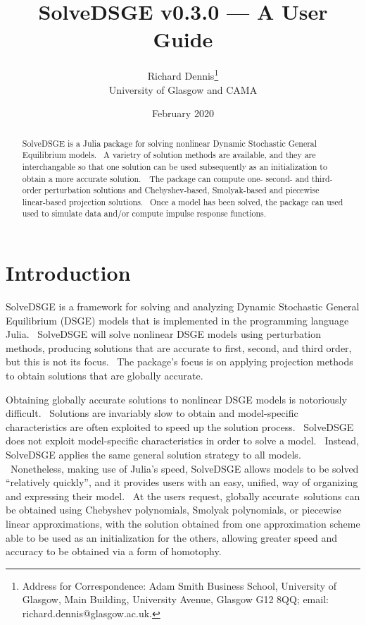 \documentclass[notitlepage,11pt]{article}
\begin{document}
\author{Richard Dennis\thanks{%
Address for Correspondence: Adam Smith Business School, University of
Glasgow, Main Building, University Avenue, Glasgow G12 8QQ; email:
richard.dennis@glasgow.ac.uk.} \\
University of Glasgow and CAMA}
\title{SolveDSGE v0.3.0 --- A User Guide}
\date{February 2020}
\maketitle

\begin{abstract}
SolveDSGE is a Julia package for solving nonlinear Dynamic Stochastic
General Equilibrium models. \ A varietry of solution methods are available,
and they are interchangable so that one solution can be used subsequently as
an initialization to obtain a more accurate solution.\noindent\ \ The
package can compute one- second- and third-order perturbation solutions and
Chebyshev-based, Smolyak-based and piecewise linear-based projection
solutions. \ Once a model has been solved, the package can used used to
simulate data and/or compute impulse response functions.

\vspace{0.12in}
\end{abstract}

\thispagestyle{empty}\newpage \setlength{\baselineskip}{18.95pt}%
\setcounter{page}{1}

\section{Introduction}

SolveDSGE is a framework for solving and analyzing Dynamic Stochastic
General Equilibrium (DSGE) models that is implemented in the programming
language Julia. \ SolveDSGE will solve nonlinear DSGE models using
perturbation methods, producing solutions that are accurate to first,
second, and third order, but this is not its focus. \ The package's focus is
on applying projection methods to obtain solutions that are globally
accurate.

Obtaining globally accurate solutions to nonlinear DSGE models is
notoriously difficult. \ Solutions are invariably slow to obtain and
model-specific characteristics are often exploited to speed up the solution
process. \ SolveDSGE does not exploit model-specific characteristics in
order to solve a model. \ Instead, SolveDSGE applies the same general
solution strategy to all models. \ Nonetheless, making use of Julia's speed,
SolveDSGE allows models to be solved \textquotedblleft relatively
quickly\textquotedblright , and it provides users with an easy, unified, way
of organizing and expressing their model. \ At the users request, globally
accurate\ solutions can be obtained using Chebyshev polynomials, Smolyak
polynomials, or piecewise linear approximations, with the solution obtained
from one approximation scheme able to be used as an initialization for the
others, allowing greater speed and accuracy to be obtained via a form of
homotophy.
\end{document}
